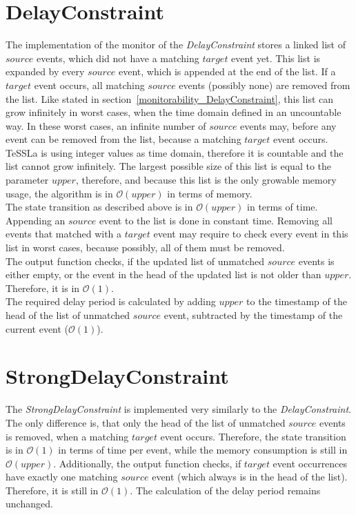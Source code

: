\section{DelayConstraint}
	The implementation of the monitor of the \emph{DelayConstraint} stores a linked list of $source$ events, which did not have a matching $target$ event yet. This list is expanded by every $source$ event, which is appended at the end of the list. If a $target$ event occurs, all matching $source$ events (possibly none) are removed from the list. Like stated in section~\ref{monitorability_DelayConstraint}, this list can grow infinitely in worst cases, when the time domain defined in an uncountable way. In these worst cases, an infinite number of $source$ events may, before any event can be removed from the list, because a matching $target$ event occurs.\\
	TeSSLa is using integer values as time domain, therefore it is countable and the list cannot grow infinitely. The largest possible size of this list is equal to the parameter $upper$, therefore, and because this list is the only growable memory usage, the algorithm is in $\mathcal{O}(upper)$ in terms of memory.\\
	The state transition as described above is in  $\mathcal{O}(upper)$ in terms of time. Appending an $source$ event to the list is done in constant time. Removing all events that matched with a $target$ event may require to check every event in this list in worst cases, because possibly, all of them must be removed.\\
	The output function checks, if the updated list of unmatched $source$ events is either empty, or the event in the head of the updated list is not older than $upper$. Therefore, it is in $\mathcal{O}(1)$.\\
	The required delay period is calculated by adding $upper$ to the timestamp of the head of the list of unmatched $source$ event, subtracted by the timestamp of the current event ($\mathcal{O}(1)$).
	
\section{StrongDelayConstraint}
	The \emph{StrongDelayConstraint} is implemented very similarly to the \emph{DelayConstraint}. The only difference is, that only the head of the list of unmatched $source$ events is removed, when a matching $target$ event occurs. Therefore, the state transition is in $\mathcal{O}(1)$ in terms of time per event, while the memory consumption is still in  $\mathcal{O}(upper)$. Additionally, the output function checks, if $target$ event occurrences have exactly one matching $source$ event (which always is in the head of the list). Therefore, it is still in $\mathcal{O}(1)$. The calculation of the delay period remains unchanged.
	
